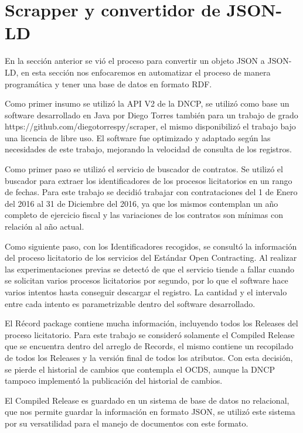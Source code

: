 \section{Scrapper y convertidor de JSON-LD}

En la sección anterior se vió el proceso para convertir un objeto JSON a JSON-LD, en esta sección nos enfocaremos en automatizar el proceso de manera programática y tener una base de datos en formato RDF.

Como primer insumo se utilizó la API V2 de la DNCP, se utilizó como base un software desarrollado en Java por Diego Torres también para un trabajo de grado https://github.com/diegotorrespy/scraper, el mismo disponibilizó el trabajo bajo una licencia de libre uso. El software fue optimizado y adaptado según las necesidades de este trabajo, mejorando la velocidad de consulta de los registros.

Como primer paso se utilizó el servicio de buscador de contratos. Se utilizó el buscador para extraer los identificadores de los procesos licitatorios en un rango de fechas. Para este trabajo se decidió trabajar con contrataciones del 1 de Enero del 2016 al 31 de Diciembre del 2016, ya que los mismos contemplan un año completo de ejercicio fiscal y las variaciones de los contratos son mínimas con relación al año actual.



Como siguiente paso, con los Identificadores recogidos, se consultó la información del proceso licitatorio de los servicios del Estándar Open Contracting. Al realizar las experimentaciones previas se detectó de que el servicio tiende a fallar cuando se solicitan varios procesos licitatorios por segundo, por lo que el software hace varios intentos hasta conseguir descargar el registro. La cantidad y el intervalo entre cada intento es parametrizable dentro del software desarrollado.

El Récord package contiene mucha información, incluyendo todos los Releases del proceso licitatorio. Para este trabajo se consideró solamente el Compiled Release que se encuentra dentro del arreglo de Records, el mismo contiene un recopilado de todos los Releases y la versión final de todos los atributos. Con esta decisión, se pierde el historial de cambios que contempla el OCDS, aunque la DNCP tampoco implementó la publicación del historial de cambios.

El Compiled Release es guardado en un sistema de base de datos no relacional, que nos permite guardar la información en formato JSON, se utilizó este sistema por su versatilidad para el manejo de documentos con este formato.


